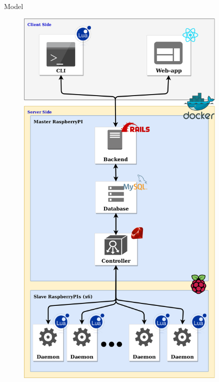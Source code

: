 \documentclass[final,hyperref={pdfpagelabels=false}]{beamer}
\begin{document}
\begin{frame}[t]
\begin{columns}[t]
\begin{column}{.465\textwidth}

\end{column} %
\begin{column}{.03\textwidth}\end{column} %
 
\begin{column}{.465\textwidth} %


\begin{block}{Model}

\noindent
\begin{figure}
    \centering
    \includegraphics[scale=0.203]{SplayNewIcon.png}
\end{figure}


\end{block}
\end{column}
\end{columns}
\end{frame}
\end{document}
